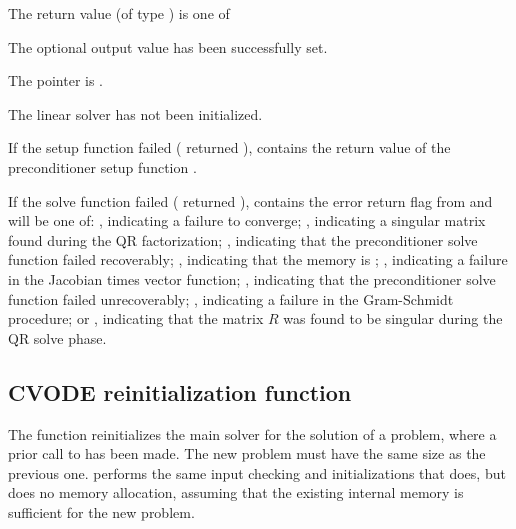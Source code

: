 {
  The return value  (of type ) is one of
  \begin{args}
  \item[\Id{CVSPGMR\_SUCCESS}] 
    The optional output value has been successfully set.
  \item[\Id{CVSPGMR\_MEM\_NULL}]
    The  pointer is .
  \item[\Id{CVSPGMR\_LMEM\_NULL}]
    The {\cvspgmr} linear solver has not been initialized.
  \end{args}
}
{
  If the {\cvspgmr} setup function failed ( returned
  ),  contains the return value of the
  preconditioner setup function .

  If the {\cvspgmr} solve function failed ( returned
  ),  contains the error return flag from
   and will be one of:
 , indicating a failure to converge;
 , indicating a singular matrix found during the QR
  factorization;
 , indicating that the preconditioner solve function
  failed recoverably;
  , indicating that the {\spgmr} memory is ;
  , indicating a failure in the Jacobian times vector
  function;
  , indicating that the preconditioner solve
  function  failed unrecoverably;
  , indicating a failure in the Gram-Schmidt procedure; 
  or , indicating that the matrix $R$ was found to be
  singular during the QR solve phase.
}

\subsection{CVODE reinitialization function}\label{sss:cvreinit}

The function  reinitializes the main {\cvode} solver for
the solution of a problem, where a prior call to  has
been made. The new problem must have the same size as the previous one.
 performs the same input checking and initializations 
that  does, but does no memory allocation, assuming that the 
existing internal memory is sufficient for the new problem.             
                                                                 
